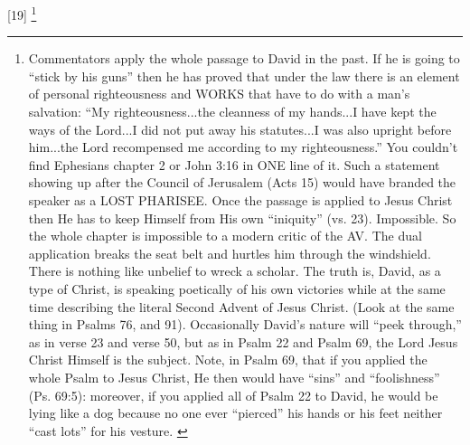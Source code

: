 [19] \footnote{Commentators apply the whole passage to David in the past. If he is going to “stick by his guns” then he has proved that under the law there is an element of personal righteousness and WORKS that have to do with a man’s salvation: “My righteousness...the cleanness of my hands...I have kept the ways of the Lord...I did not put away his statutes...I was also upright before him...the Lord recompensed me according to my righteousness.” You couldn’t find Ephesians chapter 2 or John 3:16 in ONE line of it. Such a statement showing up after the Council of Jerusalem (Acts 15) would have branded the speaker as a LOST PHARISEE.
Once the passage is applied to Jesus Christ then He has to keep Himself from His own “iniquity” (vs. 23). Impossible. So the whole chapter is impossible to a modern critic of the AV. The dual application breaks the seat belt and hurtles him through the windshield. There is nothing like unbelief to wreck a scholar. The truth is, David, as a type of Christ, is speaking poetically of his own victories while at the same time describing the literal Second Advent of Jesus Christ. (Look at the same thing in Psalms 76, and 91). Occasionally David’s nature will “peek through,” as in verse 23 and verse 50, but as in Psalm 22 and Psalm 69, the Lord Jesus Christ Himself is the subject. Note, in Psalm 69, that if you applied the whole Psalm to Jesus Christ, He then would have “sins” and “foolishness” (Ps. 69:5): moreover, if you applied all of Psalm 22 to David, he would be lying like a dog because no one ever “pierced” his hands or his feet neither “cast lots” for his vesture. \cite{Ruckman1992Psalms}}